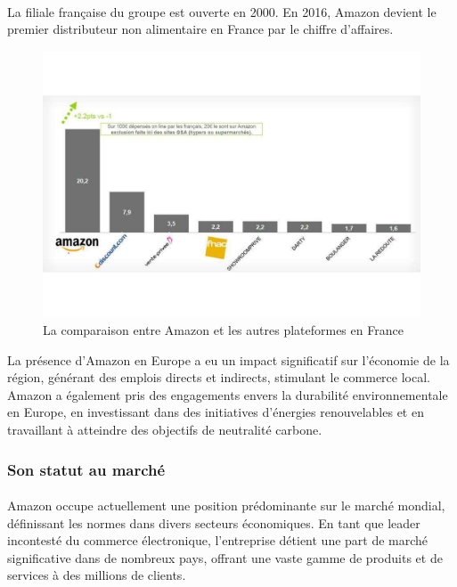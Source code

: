 \paragraph{}
\vspace{-2em}  %
La filiale française du groupe est ouverte en 2000. En 2016, Amazon devient le premier distributeur non alimentaire en France par le chiffre d'affaires.

\begin{figure}[htbp]
    \centering
    \includegraphics[width=0.8\linewidth]{./Graphismes-UTC/logos/Amazon/000315176_illustration_large.pdf}\hfill
    \caption{La comparaison entre Amazon et les autres plateformes en France \cite{turnover}}
\end{figure}
La présence d'Amazon en Europe a eu un impact significatif sur l'économie de la région, générant des emplois directs et indirects, stimulant le commerce local.
Amazon a également pris des engagements envers la durabilité environnementale en Europe, en investissant dans des initiatives d'énergies renouvelables et en travaillant à atteindre des objectifs de neutralité carbone.

\subsubsection{Son statut au marché}

\paragraph{}
\vspace{-2em}  %
Amazon occupe actuellement une position prédominante sur le marché mondial, définissant les normes dans divers secteurs économiques. En tant que leader incontesté du commerce électronique, l'entreprise détient une part de marché significative dans de nombreux pays, offrant une vaste gamme de produits et de services à des millions de clients. 

